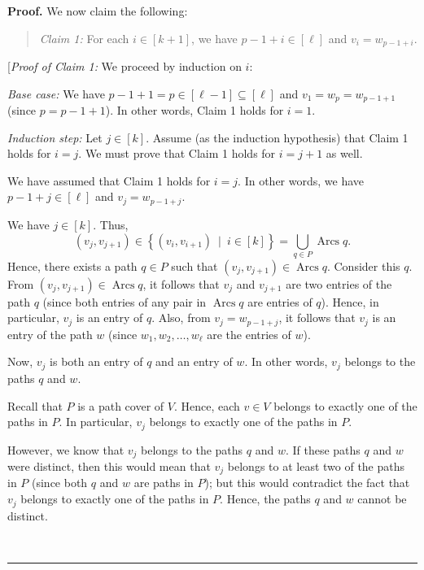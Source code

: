 \documentclass[numbers=enddot,12pt,final,onecolumn,notitlepage]{scrartcl}%
\numberwithin{exer}{section}
\theoremstyle{definition}
\newenvironment{statement}{\begin{quote}}{\end{quote}}
\newenvironment{proof}[1][Proof]{\noindent\textbf{#1.} }{\ \rule{0.5em}{0.5em}}
\let\cupnonlimits\bigcup
\renewcommand{\bigcup}{\cupnonlimits\limits}
\newenvironment{verlong}{}{}
\begin{document}
\begin{verlong}
\begin{proof}
We now claim the following:

\begin{statement}
\textit{Claim 1:} For each $i\in\left[  k+1\right]  $, we have $p-1+i\in
\left[  \ell\right]  $ and $v_{i}=w_{p-1+i}$.
\end{statement}

[\textit{Proof of Claim 1:} We proceed by induction on $i$:

\textit{Base case:} We have $p-1+1=p\in\left[  \ell-1\right]  \subseteq\left[
\ell\right]  $ and $v_{1}=w_{p}=w_{p-1+1}$ (since $p=p-1+1$). In other words,
Claim 1 holds for $i=1$.

\textit{Induction step:} Let $j\in\left[  k\right]  $. Assume (as the
induction hypothesis) that Claim 1 holds for $i=j$. We must prove that Claim 1
holds for $i=j+1$ as well.

We have assumed that Claim 1 holds for $i=j$. In other words, we have
$p-1+j\in\left[  \ell\right]  $ and $v_{j}=w_{p-1+j}$.

We have $j\in\left[  k\right]  $. Thus,%
\[
\left(  v_{j},v_{j+1}\right)  \in\left\{  \left(  v_{i},v_{i+1}\right)
\ \mid\ i\in\left[  k\right]  \right\}  =\bigcup_{q\in P}\operatorname*{Arcs}%
q.
\]
Hence, there exists a path $q\in P$ such that $\left(  v_{j},v_{j+1}\right)
\in\operatorname*{Arcs}q$. Consider this $q$. From $\left(  v_{j}%
,v_{j+1}\right)  \in\operatorname*{Arcs}q$, it follows that $v_{j}$ and
$v_{j+1}$ are two entries of the path $q$ (since both entries of any pair in
$\operatorname*{Arcs}q$ are entries of $q$). Hence, in particular, $v_{j}$ is
an entry of $q$. Also, from $v_{j}=w_{p-1+j}$, it follows that $v_{j}$ is an
entry of the path $w$ (since $w_{1},w_{2},\ldots,w_{\ell}$ are the entries of
$w$).

Now, $v_{j}$ is both an entry of $q$ and an entry of $w$. In other words,
$v_{j}$ belongs to the paths $q$ and $w$.

Recall that $P$ is a path cover of $V$. Hence, each $v\in V$ belongs to
exactly one of the paths in $P$. In particular, $v_{j}$ belongs to exactly one
of the paths in $P$.

However, we know that $v_{j}$ belongs to the paths $q$ and $w$. If these paths
$q$ and $w$ were distinct, then this would mean that $v_{j}$ belongs to at
least two of the paths in $P$ (since both $q$ and $w$ are paths in $P$); but
this would contradict the fact that $v_{j}$ belongs to exactly one of the
paths in $P$. Hence, the paths $q$ and $w$ cannot be distinct.


\end{proof}
\end{verlong}
\end{document}
